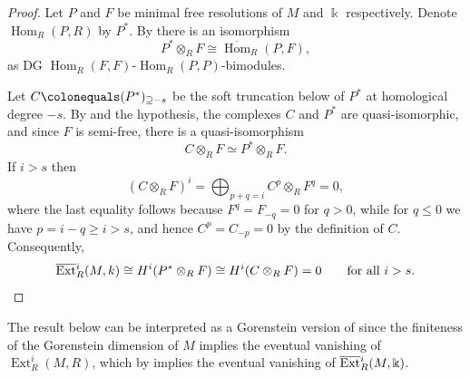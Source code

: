 \documentclass{amsart}
\theoremstyle{definition}
\theoremstyle{definition}
\theoremstyle{remark}
\numberwithin{equation}{section}
\newcommand{\kk}{\Bbbk}
\newcommand{\Ext}{\operatorname{Ext}}
\newcommand{\bExt}{\overline{\operatorname{Ext}}{\vphantom E}}
\newcommand{\Hom}{\operatorname{Hom}}
\newcommand{\bHom}{\overline{\operatorname{Hom}}}
\begin{document}
\begin{proof}
Let $P$ and $F$ be minimal free resolutions of $M$ and $\kk$ respectively. Denote $\Hom_R(P,R)$ by $P^*$. By \cite[Lemma 1.3.3]{stableExt} there is an isomorphism
\[
P^*\otimes_RF\cong\bHom_R(P,F),
\]
as DG $\Hom_R(F,F)$-$\Hom_R(P,P)$-bimodules.

Let $C\colonequals(P^*)_{\supseteq-s}$ be the soft truncation below of $P^*$ at homological degree $-s$. By \cite[Proposition 4.2.4]{LarsBook} and the hypothesis, the complexes $C$ and $P^*$ are quasi-isomorphic, and since $F$ is semi-free, there is a quasi-isomorphism
\[
C\otimes_RF\simeq P^*\otimes_RF.
\]
If $i>s$ then
\[
(C\otimes_RF)^i=\bigoplus_{p+q=i}C^p\otimes_RF^q=0,
\]
where the last equality follows because $F^q=F_{-q}=0$ for
$q>0$, while for $q\leq 0$ we have $p=i-q\geq i>s$, and hence
$C^p=C_{-p}=0$ by the definition of $C$. Consequently,
\[
\bExt_R^i(M,k)
\cong H^i(P^*\otimes_R F)
\cong H^i(C\otimes_R F)
=0
\qquad\text{for all }i>s.\qedhere
\]
\end{proof}
The result below can be interpreted as a Gorenstein version of \cite[Theorem 2.4 (iii)$\Rightarrow$(i)]{AIBass} since the finiteness of the Gorenstein dimension of $M$ implies the eventual vanishing of $\Ext_R^i(M,R)$, which by  implies the eventual vanishing of $\bExt_R^i(M,\kk)$.
\end{document}
